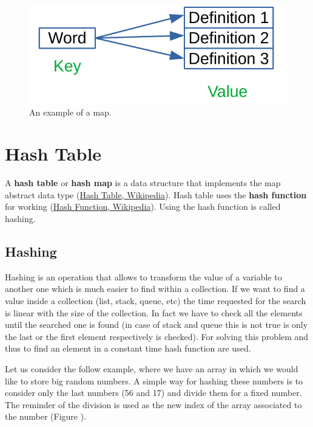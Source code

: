 \begin{figure}[H]
	\begin{center}
		\includegraphics[scale=.6]{chapters/datastructures/images/map_1.pdf}
		\caption[An example of a map.]{An example of a map.}
		\label{map_1}
	\end{center}
\end{figure}

\section{Hash Table}
A \textbf{hash table} or \textbf{hash map} is a data structure that implements the map abstract data type \cite{wikihashtable} (\href{https://en.wikipedia.org/wiki/Hash_table}{Hash Table, Wikipedia}). Hash table uses the \textbf{hash function} for working \cite{wikihashfunction} (\href{https://en.wikipedia.org/wiki/Hash_function}{Hash Function, Wikipedia}). Using the hash function is called hashing.

\subsection{Hashing}
Hashing is an operation that allows to transform the value of a variable to another one which is much easier to find within a collection. If we want to find a value inside a collection (list, stack, queue, etc) the time requested for the search is linear with the size of the collection. In fact we have to check all the elements until the searched one is found (in case of stack and queue this is not true is only the last or the first element respectively is checked). For solving this problem and thus to find an element in a constant time hash function are used. 

Let us consider the follow example, where we have an array in which we would like to store big random numbers. A simple way for hashing these numbers is to consider only the last numbers (56 and 17) and divide them for a fixed number. The reminder of the division is used as the new index of the array associated to the number (Figure ).


